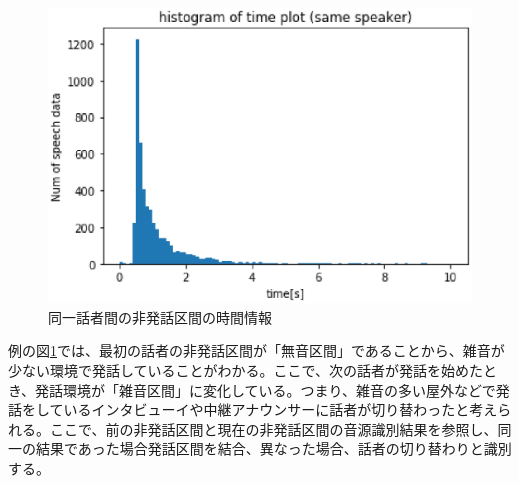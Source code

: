 \begin{figure}[htb]
  \begin{center}
    \includegraphics{./figure/same_sp.eps}
  \end{center}
  \caption{同一話者間の非発話区間の時間情報 \label{fig:flow_prob2}}
\end{figure}

例の図\ref{fig:flow_prob2}では、最初の話者の非発話区間が「無音区間」であることから、雑音が少ない環境で発話していることがわかる。ここで、次の話者が発話を始めたとき、発話環境が「雑音区間」に変化している。つまり、雑音の多い屋外などで発話をしているインタビューイや中継アナウンサーに話者が切り替わったと考えられる。ここで、前の非発話区間と現在の非発話区間の音源識別結果を参照し、同一の結果であった場合発話区間を結合、異なった場合、話者の切り替わりと識別する。
